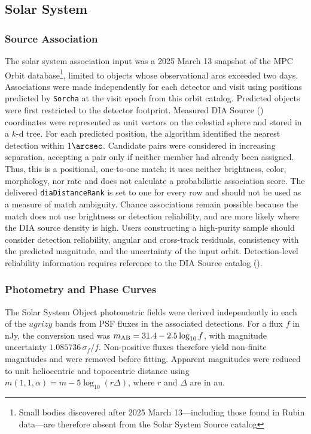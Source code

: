 \subsection{Solar System}
\subsubsection{Source Association}
\label{sec:ss-association}

The solar system association input was a 2025 March 13 snapshot of the MPC Orbit database\footnote{Small bodies discovered after 2025 March 13---including those found in Rubin data---are therefore absent from the Solar System \gls{Source} catalog }, limited to objects whose observational arcs exceeded two days.
Associations were made independently for each detector and visit using positions predicted by \texttt{Sorcha} \citep[][]{2025AJ....170..100M,2025AJ....170...97H} at the visit epoch from this orbit catalog.
Predicted objects were first restricted to the detector \gls{footprint}.
Measured \gls{DIA} Source () coordinates were represented as unit vectors on the celestial sphere and stored in a $k$-d tree.
For each predicted position, the \gls{algorithm} identified the nearest detection within $1\arcsec$.
Candidate pairs were considered in increasing separation, accepting a pair only if neither member had already been assigned.
Thus, this is a positional, one-to-one match; it uses neither brightness, color, morphology, nor rate and does not calculate a probabilistic association score.
The delivered \texttt{diaDistanceRank} is set to one for every row and should not be used as a measure of match ambiguity.
Chance associations remain possible because the match does not use brightness or detection reliability, and are more likely where the \gls{DIA} source density is high.
Users constructing a high-purity sample should consider detection reliability, angular and cross-track residuals, consistency with the predicted magnitude, and the uncertainty of the input orbit.
Detection-level reliability information requires reference to the \gls{DIA} Source catalog ().

\subsubsection{Photometry and Phase Curves}

The \gls{Solar System Object} photometric fields were derived independently in each of the $ugrizy$ bands from PSF fluxes in the associated detections.
For a \gls{flux} $f$ in nJy, the conversion used was $m_{\rm AB}=31.4-2.5\log_{10}f$, with magnitude uncertainty $1.085736\,\sigma_f/f$.
Non-positive fluxes therefore yield non-finite magnitudes and were removed before fitting.
Apparent magnitudes were reduced to unit heliocentric and topocentric distance using $m(1,1,\alpha)=m-5\log_{10}(r\Delta)$, where $r$ and $\Delta$ are in \gls{au}.

